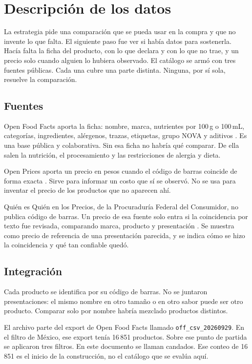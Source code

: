 \section{Descripción de los datos}

La estrategia pide una comparación que se pueda usar en la compra y que no invente lo que falta. El siguiente paso fue ver si había datos para sostenerla. Hacía falta la ficha del producto, con lo que declara y con lo que no trae, y un precio solo cuando alguien lo hubiera observado. El catálogo se armó con tres fuentes públicas. Cada una cubre una parte distinta. Ninguna, por sí sola, resuelve la comparación.

\subsection{Fuentes}

Open Food Facts aporta la ficha: nombre, marca, nutrientes por 100\,g o 100\,mL, categorías, ingredientes, alérgenos, trazas, etiquetas, grupo NOVA y aditivos \citep{openfoodfacts2026}. Es una base pública y colaborativa. Sin esa ficha no habría qué comparar. De ella salen la nutrición, el procesamiento y las restricciones de alergia y dieta.

Open Prices aporta un precio en pesos cuando el código de barras coincide de forma exacta \citep{openprices2026}. Sirve para informar un costo que sí se observó. No se usa para inventar el precio de los productos que no aparecen ahí.

Quién es Quién en los Precios, de la Procuraduría Federal del Consumidor, no publica código de barras. Un precio de esa fuente solo entra si la coincidencia por texto fue revisada, comparando marca, producto y presentación \citep{profeco2026}. Se muestra como precio de referencia de una presentación parecida, y se indica cómo se hizo la coincidencia y qué tan confiable quedó.

\subsection{Integración}

Cada producto se identifica por su código de barras. No se juntaron presentaciones: el mismo nombre en otro tamaño o en otro sabor puede ser otro producto. Comparar solo por nombre habría mezclado productos distintos.

El archivo parte del export de Open Food Facts llamado \texttt{off\_csv\_20260929}. En el filtro de México, ese export tenía 16\,851 productos. Sobre ese punto de partida se aplicaron tres filtros. En este documento se llaman candados. Ese conteo de 16\,851 es el inicio de la construcción, no el catálogo que se evalúa aquí.

